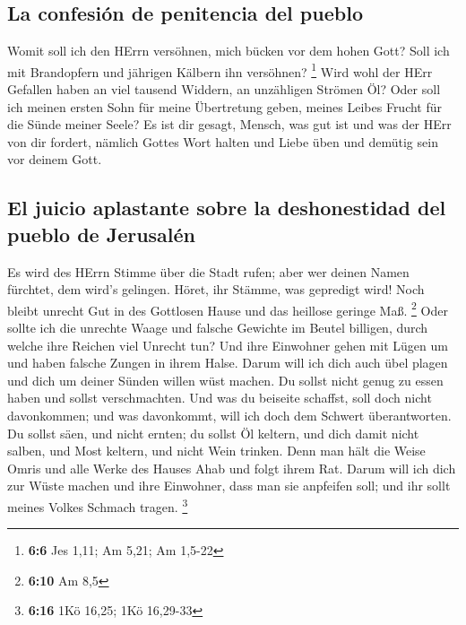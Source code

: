 \hypertarget{la-confesiuxf3n-de-penitencia-del-pueblo}{%
\subsection{La confesión de penitencia del
pueblo}\label{la-confesiuxf3n-de-penitencia-del-pueblo}}

 Womit soll ich den HErrn versöhnen, mich bücken vor dem
hohen Gott? Soll ich mit Brandopfern und jährigen Kälbern ihn versöhnen?
\footnote{\textbf{6:6} Jes 1,11; Am 5,21; Am 1,5-22}  Wird
wohl der HErr Gefallen haben an viel tausend Widdern, an unzähligen
Strömen Öl? Oder soll ich meinen ersten Sohn für meine Übertretung
geben, meines Leibes Frucht für die Sünde meiner Seele? 
Es ist dir gesagt, Mensch, was gut ist und was der HErr von dir fordert,
nämlich Gottes Wort halten und Liebe üben und demütig sein vor deinem
Gott.

\hypertarget{el-juicio-aplastante-sobre-la-deshonestidad-del-pueblo-de-jerusaluxe9n}{%
\subsection{El juicio aplastante sobre la deshonestidad del pueblo de
Jerusalén}\label{el-juicio-aplastante-sobre-la-deshonestidad-del-pueblo-de-jerusaluxe9n}}

 Es wird des HErrn Stimme über die Stadt rufen; aber wer
deinen Namen fürchtet, dem wird's gelingen. Höret, ihr Stämme, was
gepredigt wird!  Noch bleibt unrecht Gut in des Gottlosen
Hause und das heillose geringe Maß. \footnote{\textbf{6:10} Am 8,5}
 Oder sollte ich die unrechte Waage und falsche Gewichte
im Beutel billigen,  durch welche ihre Reichen viel
Unrecht tun? Und ihre Einwohner gehen mit Lügen um und haben falsche
Zungen in ihrem Halse.  Darum will ich dich auch übel
plagen und dich um deiner Sünden willen wüst machen.  Du
sollst nicht genug zu essen haben und sollst verschmachten. Und was du
beiseite schaffst, soll doch nicht davonkommen; und was davonkommt, will
ich doch dem Schwert überantworten.  Du sollst säen, und
nicht ernten; du sollst Öl keltern, und dich damit nicht salben, und
Most keltern, und nicht Wein trinken.  Denn man hält die
Weise Omris und alle Werke des Hauses Ahab und folgt ihrem Rat. Darum
will ich dich zur Wüste machen und ihre Einwohner, dass man sie
anpfeifen soll; und ihr sollt meines Volkes Schmach tragen. \footnote{\textbf{6:16}
  1Kö 16,25; 1Kö 16,29-33}

